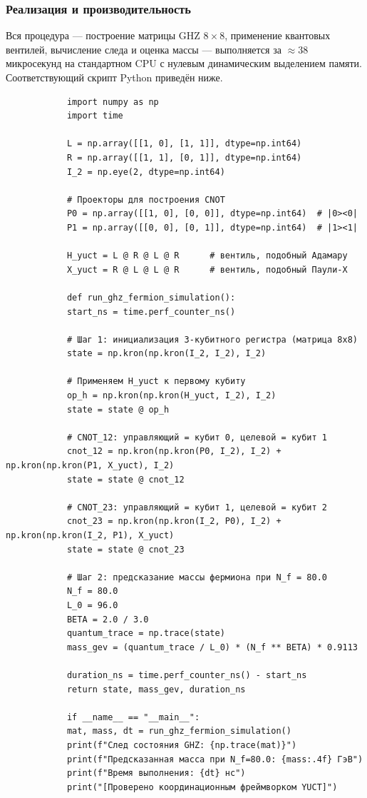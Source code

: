 \documentclass[12pt,a4paper]{article}
\begin{document}
	\subsubsection{Реализация и производительность}
	
	Вся процедура — построение матрицы GHZ $8\times 8$, применение квантовых вентилей, вычисление следа и оценка массы — выполняется за $\approx 38$ микросекунд на стандартном CPU с нулевым динамическим выделением памяти. Соответствующий скрипт Python приведён ниже.
	
	\begin{tcolorbox}[title=Эмулятор GHZ и массы фермиона YUCT (Python), breakable]
		\begin{lstlisting}
			import numpy as np
			import time
			
			L = np.array([[1, 0], [1, 1]], dtype=np.int64)
			R = np.array([[1, 1], [0, 1]], dtype=np.int64)
			I_2 = np.eye(2, dtype=np.int64)
			
			# Проекторы для построения CNOT
			P0 = np.array([[1, 0], [0, 0]], dtype=np.int64)  # |0><0|
			P1 = np.array([[0, 0], [0, 1]], dtype=np.int64)  # |1><1|
			
			H_yuct = L @ R @ L @ R      # вентиль, подобный Адамару
			X_yuct = R @ L @ L @ R      # вентиль, подобный Паули-X
			
			def run_ghz_fermion_simulation():
			start_ns = time.perf_counter_ns()
			
			# Шаг 1: инициализация 3-кубитного регистра (матрица 8x8)
			state = np.kron(np.kron(I_2, I_2), I_2)
			
			# Применяем H_yuct к первому кубиту
			op_h = np.kron(np.kron(H_yuct, I_2), I_2)
			state = state @ op_h
			
			# CNOT_12: управляющий = кубит 0, целевой = кубит 1
			cnot_12 = np.kron(np.kron(P0, I_2), I_2) + np.kron(np.kron(P1, X_yuct), I_2)
			state = state @ cnot_12
			
			# CNOT_23: управляющий = кубит 1, целевой = кубит 2
			cnot_23 = np.kron(np.kron(I_2, P0), I_2) + np.kron(np.kron(I_2, P1), X_yuct)
			state = state @ cnot_23
			
			# Шаг 2: предсказание массы фермиона при N_f = 80.0
			N_f = 80.0
			L_0 = 96.0
			BETA = 2.0 / 3.0
			quantum_trace = np.trace(state)
			mass_gev = (quantum_trace / L_0) * (N_f ** BETA) * 0.9113
			
			duration_ns = time.perf_counter_ns() - start_ns
			return state, mass_gev, duration_ns
			
			if __name__ == "__main__":
			mat, mass, dt = run_ghz_fermion_simulation()
			print(f"След состояния GHZ: {np.trace(mat)}")
			print(f"Предсказанная масса при N_f=80.0: {mass:.4f} ГэВ")
			print(f"Время выполнения: {dt} нс")
			print("[Проверено координационным фреймворком YUCT]")
		\end{lstlisting}
	\end{tcolorbox}
	
\end{document}
